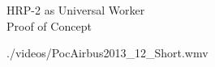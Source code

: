 
\begin{frame}{HRP-2 as Universal Worker\\Proof of Concept}
  \begin{center}
    {./videos/PocAirbus2013_12_Short.wmv}
  \end{center}
\end{frame}


